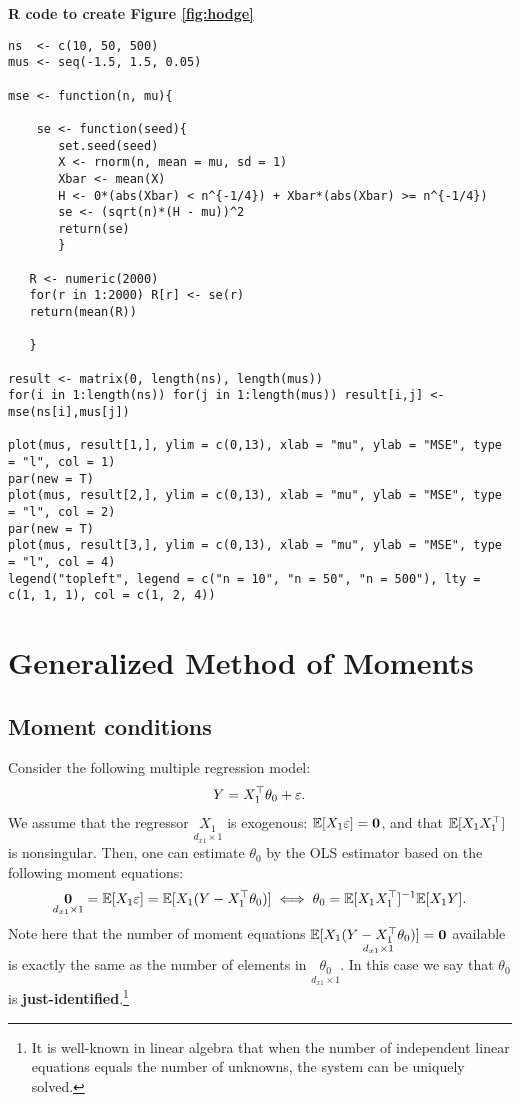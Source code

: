 \documentclass[11pt, A4paper, openany, uplatex]{book}
\begin{document}
\textbf{R code to create Figure \ref{fig:hodge}}

\bigskip

\begin{lstlisting}[basicstyle=\ttfamily\footnotesize, frame=single]
ns  <- c(10, 50, 500)
mus <- seq(-1.5, 1.5, 0.05)

mse <- function(n, mu){

	se <- function(seed){
	   set.seed(seed)
	   X <- rnorm(n, mean = mu, sd = 1)
	   Xbar <- mean(X)
	   H <- 0*(abs(Xbar) < n^{-1/4}) + Xbar*(abs(Xbar) >= n^{-1/4})
	   se <- (sqrt(n)*(H - mu))^2
	   return(se)
	   }

   R <- numeric(2000)
   for(r in 1:2000) R[r] <- se(r)
   return(mean(R))
	
   }
	
result <- matrix(0, length(ns), length(mus))
for(i in 1:length(ns)) for(j in 1:length(mus)) result[i,j] <- mse(ns[i],mus[j])

plot(mus, result[1,], ylim = c(0,13), xlab = "mu", ylab = "MSE", type = "l", col = 1)
par(new = T)
plot(mus, result[2,], ylim = c(0,13), xlab = "mu", ylab = "MSE", type = "l", col = 2)
par(new = T)
plot(mus, result[3,], ylim = c(0,13), xlab = "mu", ylab = "MSE", type = "l", col = 4)
legend("topleft", legend = c("n = 10", "n = 50", "n = 500"), lty = c(1, 1, 1), col = c(1, 2, 4))
\end{lstlisting}



\chapter{Generalized Method of Moments}\label{chap:gmm}
\section{Moment conditions}\label{sec:mom}

Consider the following multiple regression model:
\begin{align*}
	Y = X_1^\top \theta_0 + \varepsilon.
\end{align*}
We assume that the regressor $\underset{d_{x1} \times 1}{X_1}$ is exogenous: $\mathbb{E} [X_1 \varepsilon] = \mathbf{0}$, and that $\mathbb{E}[X_1 X_1^\top]$ is nonsingular.
Then, one can estimate $\theta_0$ by the OLS estimator based on the following moment equations:
\begin{align*}
	\underset{d_{x1} \times 1}{\mathbf{0}} = \mathbb{E}[X_1 \varepsilon] = \mathbb{E}[X_1 (Y - X_1^\top\theta_0)]  \iff \theta_0 = \mathbb{E}[X_1 X_1^\top]^{-1} \mathbb{E}[X_1 Y].
\end{align*}
Note here that the number of moment equations $\underset{d_{x1} \times 1}{\mathbb{E}[X_1 (Y - X_1^\top \theta_0)] = \mathbf{0}}$ available is exactly the same as the number of elements in $\underset{d_{x1} \times 1}{\theta_0}$.
In this case we say that $\theta_0$ is \textbf{just-identified}.\footnote{
	It is well-known in linear algebra that when the number of independent linear equations equals the number of unknowns, the system can be uniquely solved.
}
\end{document}
